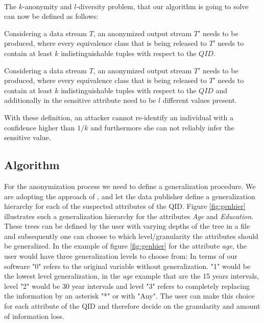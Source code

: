 \\
The $k$-anonymity and $l$-diversity problem, that our algorithm is going to solve can now be defined as follows:
\begin{definition}
Considering a data stream $T$, an anonymized output stream $T'$ needs to be produced, where every equivalence class that is being released to $T'$ needs to contain at least $k$ indistinguishable tuples with respect to the $QID$.
\end{definition}
\begin{definition}
Considering a data stream $T$, an anonymized output stream $T'$ needs to be produced, where every equivalence class that is being released to $T'$ needs to contain at least  $k$ indistinguishable tuples with respect to the $QID$ and additionally in the sensitive attribute need to be $l$ different values present.
\end{definition}
\noindent With these definition, an attacker cannot re-identify an individual with a confidence higher than $1/k$ and furthermore she can not reliably infer the sensitive value.
\newpage
\subsection{Algorithm}
For the anonymization process we need to define a generalization procedure. We are adopting the approach of , and let the data publisher define a generalization hierarchy for each of the suspected attributes of the QID. Figure \ref{fig:genhier} illustrates such a generalization hierarchy for the attributes \textit{Age} and \textit{Education}. These trees can be defined by the user with varying depths of the tree in a file and subsequently one can choose to which level/granularity the attributes should be generalized. In the example of figure \ref{fig:genhier} for the attribute \textit{age}, the user would have three generalization levels to choose from: In terms of our software "0" refers to the original variable without generalization. "1" would be the lowest level generalization, in the \textit{age} example that are the 15 years intervals, level "2" would be 30 year intervals and level "3" refers to completely replacing the information by an asterisk "*" or with "Any". The user can make this choice for each attribute of the QID and therefore decide on the granularity and amount of information loss.

